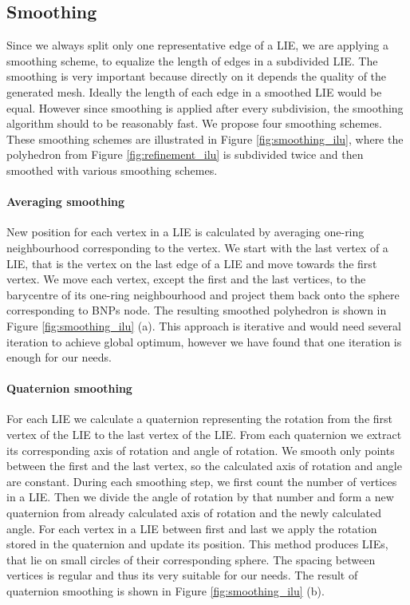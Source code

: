 \subsection{Smoothing}
Since we always split only one representative edge of a LIE, we are applying a smoothing scheme, to equalize the length of edges in a subdivided LIE. The smoothing is very important because directly on it depends the quality of the generated mesh. Ideally the length of each edge in a smoothed LIE would be equal. However since smoothing is applied after every subdivision, the smoothing algorithm should to be reasonably fast. We propose four smoothing schemes. These smoothing schemes are illustrated in Figure \ref{fig:smoothing_ilu}, where the polyhedron from Figure \ref{fig:refinement_ilu} is subdivided twice and then smoothed with various smoothing schemes.

\paragraph{Averaging smoothing}
New position for each vertex in a LIE is calculated by averaging one-ring neighbourhood corresponding to the vertex. We start with the last vertex of a LIE, that is the vertex on the last edge of a LIE and move towards the first vertex. We move each vertex, except the first and the last vertices, to the barycentre of its one-ring neighbourhood and project them back onto the sphere corresponding to BNPs node. The resulting smoothed polyhedron is shown in Figure \ref{fig:smoothing_ilu} (a). This approach is iterative and would need several iteration to achieve global optimum, however we have found that one iteration is enough for our needs.

\paragraph{Quaternion smoothing}
For each LIE we calculate a quaternion representing the rotation from the first vertex of the LIE to the last vertex of the LIE. From each quaternion we extract its corresponding axis of rotation and angle of rotation. We smooth only points between the first and the last vertex, so the calculated axis of rotation and angle are constant. During each smoothing step, we first count the number of vertices in a LIE. Then we divide the angle of rotation by that number and form a new quaternion from already calculated axis of rotation and the newly calculated angle. For each vertex in a LIE between first and last we apply the rotation stored in the quaternion and update its position. This method produces LIEs, that lie on small circles of their corresponding sphere. The spacing between vertices is regular and thus its very suitable for our needs. The result of quaternion smoothing is shown in Figure \ref{fig:smoothing_ilu} (b).

